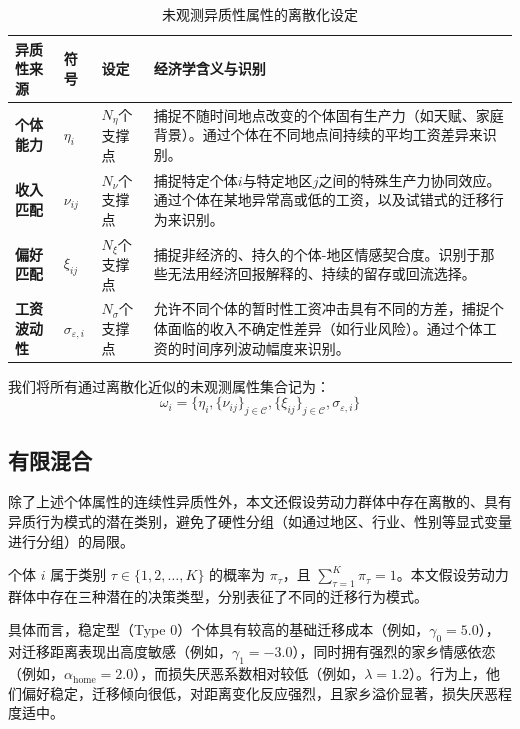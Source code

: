 \documentclass[
  a4paper,
  zihao=-4,
  fontset=mac,
  AutoFakeBold,
  AutoFakeSlant,
  oneside]{ctexbook}
\begin{document}
\begin{table}[!ht]
  \centering
  \caption{未观测异质性属性的离散化设定}
  \label{tab:unobserved_heterogeneity_setting}
  \begin{tabularx}{\textwidth}{@{}lllX@{}}
    \toprule
    \textbf{异质性来源} & \textbf{符号} & \textbf{设定} & \textbf{经济学含义与识别} \\ 
    \midrule
    \textbf{个体能力} & $\eta_i$ & $N_\eta$个支撑点 & 捕捉不随时间地点改变的个体固有生产力（如天赋、家庭背景）。通过个体在不同地点间持续的平均工资差异来识别。 \\
    \textbf{收入匹配} & $\nu_{ij}$ & $N_\nu$个支撑点 & 捕捉特定个体$i$与特定地区$j$之间的特殊生产力协同效应。通过个体在某地异常高或低的工资，以及试错式的迁移行为来识别。 \\
    \textbf{偏好匹配} & $\xi_{ij}$ & $N_\xi$个支撑点 & 捕捉非经济的、持久的个体-地区情感契合度。识别于那些无法用经济回报解释的、持续的留存或回流选择。 \\
    \textbf{工资波动性} & $\sigma_{\varepsilon,i}$ & $N_\sigma$个支撑点 & 允许不同个体的暂时性工资冲击具有不同的方差，捕捉个体面临的收入不确定性差异（如行业风险）。通过个体工资的时间序列波动幅度来识别。 \\
    \bottomrule
  \end{tabularx}
\vspace{0.5em}
\footnotesize
\end{table}

我们将所有通过离散化近似的未观测属性集合记为：
$$\omega_i = \{\eta_i, \{\nu_{ij}\}_{j \in \mathcal{C}}, \{\xi_{ij}\}_{j \in \mathcal{C}}, \sigma_{\varepsilon,i}\}$$



\subsection{有限混合}

除了上述个体属性的连续性异质性外，本文还假设劳动力群体中存在离散的、具有异质行为模式的潜在类别，避免了硬性分组（如通过地区、行业、性别等显式变量进行分组）的局限。

个体 $i$ 属于类别 $\tau \in \{1, 2, \dots, K\}$ 的概率为 $\pi_\tau$，且 $\sum\limits_{\tau=1}^K \pi_\tau = 1$。本文假设劳动力群体中存在三种潜在的决策类型，分别表征了不同的迁移行为模式。

具体而言，稳定型（Type 0）个体具有较高的基础迁移成本（例如，$\gamma_0 = 5.0$），对迁移距离表现出高度敏感（例如，$\gamma_1 = -3.0$），同时拥有强烈的家乡情感依恋（例如，$\alpha_{\text{home}} = 2.0$），而损失厌恶系数相对较低（例如，$\lambda = 1.2$）。行为上，他们偏好稳定，迁移倾向很低，对距离变化反应强烈，且家乡溢价显著，损失厌恶程度适中。
\end{document}
